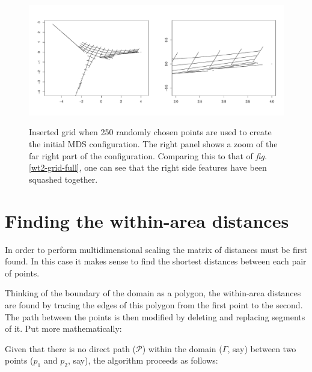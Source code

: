 \documentclass[a4paper,10pt]{article}
\newcommand{\fig}[1]{\emph{fig.} \ref{#1}}
\begin{document}
\begin{figure}
\centering
\includegraphics[width=5in]{figs/wt2-grid-samp.pdf} \\
\caption{Inserted grid when 250 randomly chosen points are used to create the initial MDS configuration. The right panel shows a zoom of the far right part of the configuration. Comparing this to that of \fig{wt2-grid-full}, one can see that the right side features have been squashed together.}
\label{wt2-grid-samp}
\end{figure}


\section{Finding the within-area distances}

In order to perform multidimensional scaling the matrix of distances must be first found. In this case it makes sense to find the shortest distances between each pair of points.

Thinking of the boundary of the domain as a polygon, the within-area distances are found by tracing the edges of this polygon from the first point to the second. The path between the points is then modified by deleting and replacing segments of it. Put more mathematically:

Given that there is no direct path ($\mathcal{P}$) within the domain ($\Gamma$, say) between two points ($p_1$ and $p_2$, say), the algorithm proceeds as follows:
\end{document}
